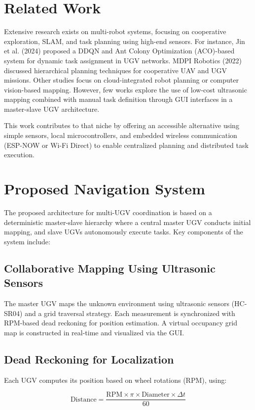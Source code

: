 \documentclass[conference]{IEEEtran}
\begin{document}
\section{Related Work}
\label{sec:related-work}
Extensive research exists on multi-robot systems, focusing on cooperative exploration, SLAM, and task planning using high-end sensors. For instance, Jin et al. (2024) proposed a DDQN and Ant Colony Optimization (ACO)-based system for dynamic task assignment in UGV networks. MDPI Robotics (2022) discussed hierarchical planning techniques for cooperative UAV and UGV missions. Other studies focus on cloud-integrated robot planning or computer vision-based mapping. However, few works explore the use of low-cost ultrasonic mapping combined with manual task definition through GUI interfaces in a master-slave UGV architecture.

This work contributes to that niche by offering an accessible alternative using simple sensors, local microcontrollers, and embedded wireless communication (ESP-NOW or Wi-Fi Direct) to enable centralized planning and distributed task execution.

\section{Proposed Navigation System}
\label{sec:proposed-system}
The proposed architecture for multi-UGV coordination is based on a deterministic master-slave hierarchy where a central master UGV conducts initial mapping, and slave UGVs autonomously execute tasks. Key components of the system include:

\subsection{Collaborative Mapping Using Ultrasonic Sensors}
 The master UGV maps the unknown environment using ultrasonic sensors (HC-SR04) and a grid traversal strategy. Each measurement is synchronized with RPM-based dead reckoning for position estimation. A virtual occupancy grid map is constructed in real-time and visualized via the GUI.

\subsection{Dead Reckoning for Localization}
Each UGV computes its position based on wheel rotations (RPM), using:

\begin{equation}
\text{Distance} = \frac{\text{RPM} \times \pi \times \text{Diameter} \times \Delta t}{60}
\end{equation}
\end{document}
